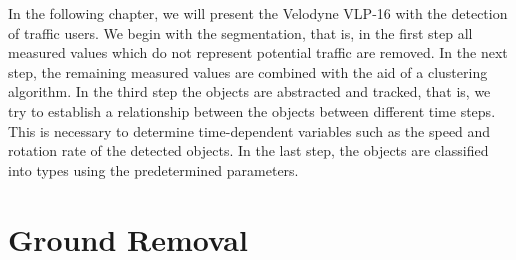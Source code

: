 \documentclass[11pt,oneside,openright]{mpreport}
\begin{document}
In the following chapter, we will present the Velodyne VLP-16 with the detection of traffic users. We begin with the segmentation,
that is, in the first step all measured values which do not represent potential traffic are removed. 
In the next step, the remaining measured values are combined with the aid of a clustering algorithm. 
In the third step the objects are abstracted and tracked, that is, we try to establish a relationship between the objects between different time steps.
This is necessary to determine time-dependent variables such as the speed and rotation rate of the detected objects.
In the last step, the objects are classified into types using the predetermined parameters.



\section{Ground Removal}
\end{document}
